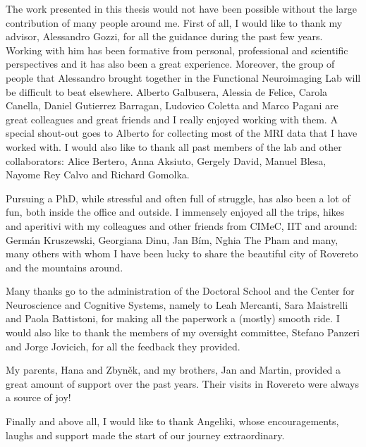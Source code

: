The work presented in this thesis would not have been possible without the large
contribution of many people around me. First of all, I would like to thank my
advisor, Alessandro Gozzi, for all the guidance during the past few years.
Working with him has been formative from personal, professional and scientific
perspectives and it has also been a great experience. Moreover, the group of
people that Alessandro brought together in the Functional Neuroimaging Lab will
be difficult to beat elsewhere. Alberto Galbusera, Alessia de Felice, Carola
Canella, Daniel Gutierrez Barragan, Ludovico Coletta and Marco Pagani are great
colleagues and great friends and I really enjoyed working with them. A special
shout-out goes to Alberto for collecting most of the MRI data that I have worked
with. I would also like to thank all past members of the lab and other
collaborators: Alice Bertero, Anna Aksiuto, Gergely David, Manuel Blesa, Nayome
Rey Calvo and Richard Gomolka.

Pursuing a PhD, while stressful and often full of struggle, has also been a lot
of fun, both inside the office and outside. I immensely enjoyed all the trips,
hikes and aperitivi with my colleagues and other friends from CIMeC, IIT and
around: Germ\'{a}n Kruszewski, Georgiana Dinu, Jan B\'{i}m, Nghia The Pham and
many, many others with whom I have been lucky to share the beautiful city of
Rovereto and the mountains around.

Many thanks go to the administration of the Doctoral School and the Center for
Neuroscience and Cognitive Systems, namely to Leah Mercanti, Sara Maistrelli and
Paola Battistoni, for making all the paperwork a (mostly) smooth ride. I would
also like to thank the members of my oversight committee, Stefano Panzeri and
Jorge Jovicich, for all the feedback they provided.

My parents, Hana and Zbyn\v{e}k, and my brothers, Jan and Martin, provided a
great amount of support over the past years. Their visits in Rovereto were
always a source of joy!

Finally and above all, I would like to thank Angeliki, whose encouragements,
laughs and support made the start of our journey extraordinary.

